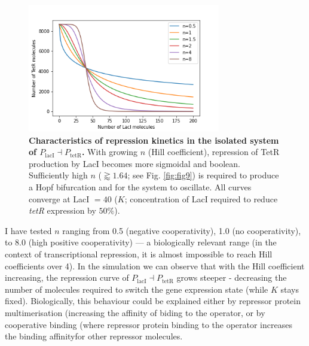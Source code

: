 \documentclass[runningheads,a4paper]{llncs}
\begin{document}
\begin{figure}
    \singlespacing
    \centering
    \includegraphics[width=0.75\textwidth]{suplementary_information_and_code/Task1_figure1.png}
    \caption{\textbf{Characteristics of repression kinetics in the isolated system of $P_{\textrm{lacI}} \dashv P_{\textrm{tetR}}$.} With growing $n$ (Hill coefficient), repression of TetR production by LacI becomes more sigmoidal and boolean. Sufficiently high $n$ ($\gtrapprox 1.64$; see Fig. \ref{fig:fig9}) is required to produce a Hopf bifurcation and for the system to oscillate. All curves converge at LacI $= 40$ ($K$; concentration of LacI required to reduce \textit{tetR} expression by $50 \%$).}
    \label{fig:fig3}
\end{figure}

I have tested $n$ ranging from 0.5 (negative cooperativity), 1.0 (no cooperativity), to 8.0 (high positive cooperativity) --- a biologically relevant range (in the context of transcriptional repression, it is almost impossible to reach Hill coefficients over 4\cite{Gonze2013a}). In the simulation we can observe that with the Hill coefficient increasing, the repression curve of $P_{\textrm{lacI}} \dashv P_{\textrm{tetR}}$ grows steeper - decreasing the number of molecules required to switch the gene expression state (while $K$ stays fixed). Biologically, this behaviour could be explained either by repressor protein multimerisation (increasing the affinity of biding to the operator, or by cooperative binding (where repressor protein binding to the operator increases the binding affinity\linebreak for other repressor molecules\cite{Gonze2013a}.
\end{document}
